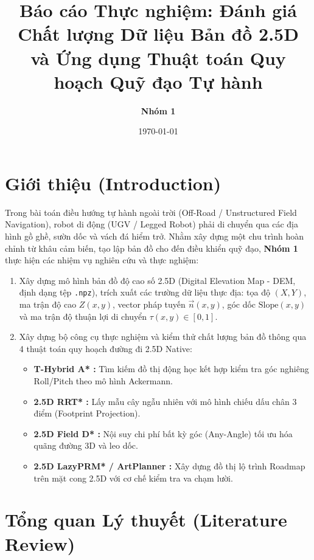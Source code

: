 \documentclass[a4paper,12pt]{article}
\begin{document}
\title{\Large \textbf{Báo cáo Thực nghiệm: Đánh giá Chất lượng Dữ liệu Bản đồ 2.5D \\ và Ứng dụng Thuật toán Quy hoạch Quỹ đạo Tự hành}}
\author{\textbf{Nhóm 1}}
\date{\today}
\maketitle

\section{Giới thiệu (Introduction)}

Trong bài toán điều hướng tự hành ngoài trời (Off-Road / Unstructured Field Navigation), robot di động (UGV / Legged Robot) phải di chuyển qua các địa hình gồ ghề, sườn dốc và vách đá hiểm trở. Nhằm xây dựng một chu trình hoàn chỉnh từ khâu cảm biến, tạo lập bản đồ cho đến điều khiển quỹ đạo, \textbf{Nhóm 1} thực hiện các nhiệm vụ nghiên cứu và thực nghiệm:
\begin{enumerate}
    \item Xây dựng mô hình bản đồ độ cao số 2.5D (Digital Elevation Map - DEM, định dạng tệp \texttt{.npz}), trích xuất các trường dữ liệu thực địa: tọa độ $(X, Y)$, ma trận độ cao $Z(x,y)$, vector pháp tuyến $\vec{n}(x,y)$, góc dốc $\text{Slope}(x,y)$ và ma trận độ thuận lợi di chuyển $\tau(x,y) \in [0, 1]$.
    \item Xây dựng bộ công cụ thực nghiệm và kiểm thử chất lượng bản đồ thông qua 4 thuật toán quy hoạch đường đi 2.5D Native:
    \begin{itemize}
        \item \textbf{T-Hybrid A* \cite{jiayangliu2023}:} Tìm kiếm đồ thị động học kết hợp kiểm tra góc nghiêng Roll/Pitch theo mô hình Ackermann.
        \item \textbf{2.5D RRT* \cite{geraldsteinbauer2025}:} Lấy mẫu cây ngẫu nhiên với mô hình chiếu dấu chân 3 điểm (Footprint Projection).
        \item \textbf{2.5D Field D* \cite{fergusondavid2005}:} Nội suy chi phí bất kỳ góc (Any-Angle) tối ưu hóa quãng đường 3D và leo dốc.
        \item \textbf{2.5D LazyPRM* / ArtPlanner \cite{lorenzwellhausen2023}:} Xây dựng đồ thị lộ trình Roadmap trên mặt cong 2.5D với cơ chế kiểm tra va chạm lười.
    \end{itemize}
\end{enumerate}

\section{Tổng quan Lý thuyết (Literature Review)}
\end{document}
